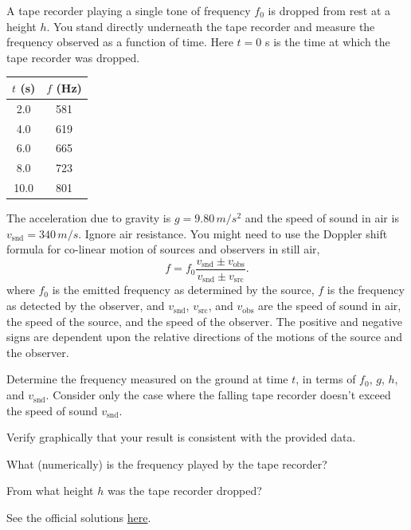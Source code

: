 \documentclass[11pt]{scrartcl}
\newcommand{\officialsol}[1]{See the official solutions \href{#1}{here}.}
\begin{document}
\begin{prob}[USAPhO 2008/A4]
    A tape recorder playing a single tone of frequency $f_0$ is dropped from rest at a height $h$. You stand directly
underneath the tape recorder and measure the frequency observed as a function of time. Here $t = 0$ s is the time at which the tape recorder was dropped.
\begin{center}
    \begin{tabular}{c|c}
        $t$ (s) & $f$ (Hz) \\ \hline
        2.0 & 581\\
        4.0 & 619\\
        6.0 & 665\\
        8.0 & 723\\
        10.0 & 801
    \end{tabular}
\end{center}
The acceleration due to gravity is $g=9.80\,\unit{m/s^2}$ and the speed of sound in air is $v_{\text{snd}} = 340\,\unit{m/s}$. Ignore air resistance. You might need to use the Doppler shift formula for co-linear motion of sources and observers in still air,
$$f = f_0 \frac{v_{\text{snd}} \pm v_{\text{obs}}}{v_{\text{snd}} \pm v_{\text{src}}}.$$
where $f_0$ is the emitted frequency as determined by the source, $f$ is the frequency as detected by the observer,
and $v_{\text{snd}}$, $v_{\text{src}}$, and $v_{\text{obs}}$ are the speed of sound in air, the speed of the source, and the speed of the observer. The positive and negative signs are dependent upon the relative directions of the motions of the source and the observer.
\begin{anum}
    \item Determine the frequency measured on the ground at time $t$, in terms of $f_0$, $g$, $h$, and $v_{\text{snd}}$. Consider only the case where the falling tape recorder doesn’t exceed the speed of sound $v_{\text{snd}}$.
    \item Verify graphically that your result is consistent with the provided data.
    \item What (numerically) is the frequency played by the tape recorder?
    \item From what height $h$ was the tape recorder dropped?
\end{anum}
\end{prob}
\begin{sol}
    \officialsol{https://aapt.org/Common/upload/USAPhO-2008-Solutions_rev-4012021.pdf}
\end{sol}
\end{document}
